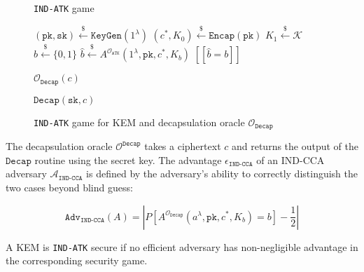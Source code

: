 \documentclass[journal=tches,submission]{iacrtrans}
\newcommand{\keygen}{\texttt{KeyGen}}
\newcommand{\encap}{\texttt{Encap}}
\newcommand{\decap}{\texttt{Decap}}
\newcommand{\pk}{\texttt{pk}}
\newcommand{\sk}{\texttt{sk}}
\newcommand{\leftsample}{\stackrel{\$}{\leftarrow}}
\newcommand{\llbrack}{[\![}
\newcommand{\rrbrack}{]\!]}
\newcommand{\norm}[1]{\left\lvert #1 \right\rvert}
\newcommand{\adv}{\texttt{Adv}}
\begin{document}
\begin{figure}[h]
    \centering
    \begin{minipage}[t]{0.49\textwidth}
        \begin{algorithm}[H]
            \caption*{\texttt{IND-ATK} game}
            \begin{algorithmic}[1]
                \State $(\pk, \sk) \leftsample \keygen(1^\lambda)$
                \State $(c^\ast, K_0) \leftsample \encap(\pk)$
                \State $K_1 \leftsample \mathcal{K}$
                \State $b \leftsample \{0, 1\}$
                \State $\hat{b} \leftsample A^{\mathcal{O}_\texttt{ATK}}(
                    1^\lambda, \pk, c^\ast, K_b
                )$
                \State \Return $\llbrack \hat{b} = b \rrbrack$
            \end{algorithmic}
        \end{algorithm}
    \end{minipage}\hfill
    \begin{minipage}[t]{0.49\textwidth}
        \begin{algorithm}[H]
        \caption*{$\mathcal{O}_\decap(c)$}
        \begin{algorithmic}[1]
            \State \Return $\decap(\sk, c)$
        \end{algorithmic}
        \end{algorithm}
    \end{minipage}
    \caption{\texttt{IND-ATK} game for KEM and decapsulation oracle $\mathcal{O}_\decap$}\label{fig:kem-game}
\end{figure}

The decapsulation oracle $\mathcal{O}^\decap$ takes a ciphertext $c$ and returns the output of the $\decap$ routine using the secret key. The advantage $\epsilon_\texttt{IND-CCA}$ of an IND-CCA adversary $\mathcal{A}_\texttt{IND-CCA}$ is defined by the adversary's ability to correctly distinguish the two cases beyond blind guess:

\begin{equation*}
    \adv_\texttt{IND-CCA}(A) = \norm{
        P[A^{\mathcal{O}_\decap}(a^\lambda, \pk, c^\ast, K_b) = b] - \frac{1}{2}
    }
\end{equation*}

A KEM is \texttt{IND-ATK} secure if no efficient adversary has non-negligible advantage in the corresponding security game.
\end{document}
